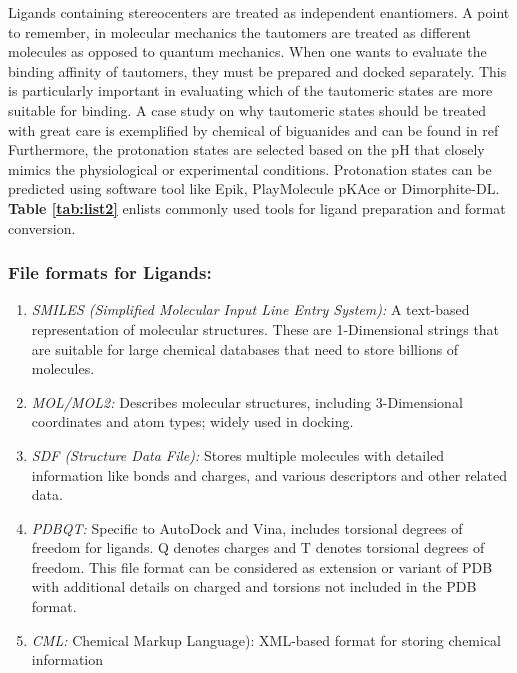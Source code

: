 \documentclass[10pt,letterpaper]{article}
\begin{document}
{{Ligands containing stereocenters are treated as independent enantiomers. A point to remember, in molecular mechanics the tautomers are treated as different molecules as opposed to quantum mechanics. When one wants to evaluate the binding affinity of tautomers, they must be prepared and docked separately. This is particularly important in evaluating which of the tautomeric states are more suitable for binding. A case study on why tautomeric states should be treated with great care is exemplified by chemical of biguanides and can be found in ref\cite{bib42} Furthermore, the protonation states are selected based on the pH that closely mimics the physiological or experimental conditions. Protonation states can be predicted using software tool like Epik\cite{bib45, bib46}, PlayMolecule pKAce\cite{bib43} or Dimorphite-DL\cite{bib44}. \textbf{Table \ref{tab:list2}} enlists commonly used tools for ligand preparation and format conversion. 

\subsubsection*{File formats for Ligands:}
\begin{enumerate}
        \item \textit{SMILES (Simplified Molecular Input Line Entry System):} A text-based representation of molecular structures. These are 1-Dimensional strings that are suitable for large chemical databases that need to store billions of molecules. 
	   \item \textit{MOL/MOL2:} Describes molecular structures, including 3-Dimensional coordinates and atom types; widely used in docking.
	   \item \textit{SDF (Structure Data File):} Stores multiple molecules with detailed information like bonds and charges, and various descriptors and other related data. 
	   \item \textit{PDBQT:} Specific to AutoDock and Vina, includes torsional degrees of freedom for ligands. Q denotes charges and T denotes torsional degrees of freedom. This file format can be considered as extension or variant of PDB with additional details on charged and torsions not included in the PDB format. 
	   \item \textit{CML:} Chemical Markup Language): XML-based format for storing chemical information
\end{enumerate}


}}
\end{document}
